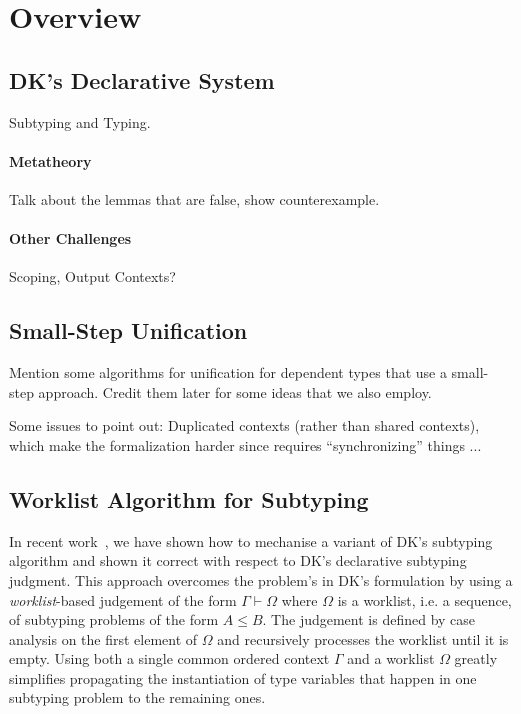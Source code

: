 \section{Overview}


\subsection{DK's Declarative System}
Subtyping and Typing. 

\paragraph{Metatheory} Talk about the lemmas that are false, show counterexample. 

\paragraph{Other Challenges} Scoping, Output Contexts?

\subsection{Small-Step Unification} Mention some algorithms for unification for 
dependent types that use a small-step approach. Credit them later for some ideas that 
we also employ.

Some issues to point out: Duplicated contexts (rather than shared contexts), which make 
the formalization harder since requires ``synchronizing'' things ...

\subsection{Worklist Algorithm for Subtyping}

In recent work~\cite{itp2018}, we have shown how to mechanise a variant of DK's
subtyping algorithm and shown it correct with respect to DK's declarative
subtyping judgment. This approach overcomes the problem's in DK's formulation
by using a \emph{worklist}-based judgement of the form $\Gamma \vdash \Omega$
where $\Omega$ is a worklist, i.e. a sequence, of subtyping problems of the
form $A \leq B$.  The judgement is defined by case analysis on the first
element of $\Omega$ and recursively processes the worklist until it is empty.
Using both a single common ordered context $\Gamma$ and a worklist $\Omega$ greatly
simplifies propagating the instantiation of type variables that happen in one
subtyping problem to the remaining ones.

